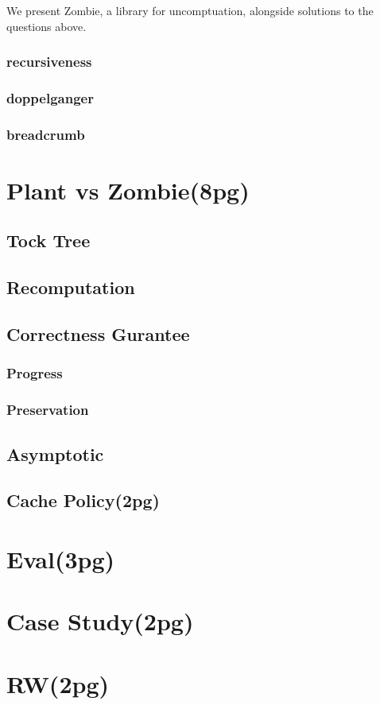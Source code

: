 \documentclass[acmsmall]{acmart}
\begin{document}
	We present Zombie, a library for uncomptuation, alongside solutions to the questions above.
	\subsubsection{recursiveness}
	\subsubsection{doppelganger}
	\subsubsection{breadcrumb}
	\section{Plant vs Zombie(8pg)}
	\subsection{Tock Tree}
	\subsection{Recomputation}
	\subsection{Correctness Gurantee}
	\subsubsection{Progress}
	\subsubsection{Preservation}
	\subsection{Asymptotic}
	\subsection{Cache Policy(2pg)}
	\section{Eval(3pg)}
	\section{Case Study(2pg)}
	\section{RW(2pg)}
\end{document}
